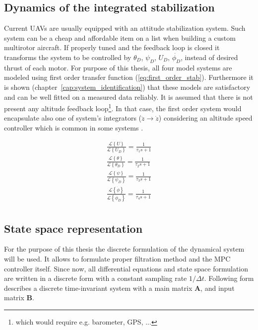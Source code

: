 \subsection{Dynamics of the integrated stabilization}

Current UAVs are usually equipped with an attitude stabilization system. Such system can be a cheap and affordable item on a list when building a custom multirotor aircraft. If properly tuned and the feedback loop is closed it transforms the system to be controlled by $\theta_D$, $\psi_D$, $U_D$, $\dot{\phi_D}$, instead of desired thrust of each motor. For purpose of this thesis, all four model systems are modeled using first order transfer function (\ref{eq:first_order_stab}). Furthermore it is shown (chapter~\ref{cap:system_identification}) that these models are satisfactory and can be well fitted on a measured data reliably. It is assumed that there is not present any altitude feedback loop\footnote{which would require e.g. barometer, GPS, ...}. In that case, the first order system would encapsulate also one of system's integrators ($\ddot{z} \rightarrow \dot{z}$) considering an altitude speed controller which is common in some systems \citep{pixhawk}\cite{ardupilot}.

\begin{equation}
\begin{split}
\frac{\mathcal{L}\left\lbrace U \right\rbrace}{\mathcal{L}\left\lbrace U_D \right\rbrace} = \frac{1}{\tau_1 s + 1}\\
\frac{\mathcal{L}\left\lbrace \theta \right\rbrace}{\mathcal{L}\left\lbrace \theta_D \right\rbrace} = \frac{1}{\tau_2 s + 1}\\
\frac{\mathcal{L}\left\lbrace \psi \right\rbrace}{\mathcal{L}\left\lbrace \psi_D \right\rbrace} = \frac{1}{\tau_3 s + 1}\\
\frac{\mathcal{L}\left\lbrace \dot{\phi} \right\rbrace}{\mathcal{L}\left\lbrace \dot{\phi}_D \right\rbrace} = \frac{1}{\tau_4 s + 1}\\
\end{split}
\label{eq:first_order_stab}
\end{equation}

\subsection{State space representation}

For the purpose of this thesis the discrete formulation of the dynamical system will be used. It allows to formulate proper filtration method and the MPC controller itself. Since now, all differential equations and state space formulation are written in a discrete form with a constant sampling rate $1/\Delta t$. Following form describes a discrete time-invariant system with a main matrix $\mathbf{A}$, and input matrix $\mathbf{B}$.

